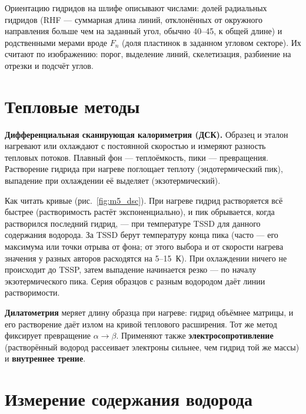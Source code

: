 Ориентацию гидридов на шлифе описывают числами: долей радиальных гидридов (RHF --- суммарная длина линий,
отклонённых от окружного направления больше чем на заданный угол, обычно 40--45\textdegree, к общей длине) и родственными
мерами вроде $F_n$ (доля пластинок в заданном угловом секторе). Их считают по изображению: порог, выделение линий,
скелетизация, разбиение на отрезки и подсчёт углов.

\section{Тепловые методы}

\textbf{Дифференциальная сканирующая калориметрия (ДСК).} Образец и эталон нагревают или охлаждают с постоянной
скоростью и измеряют разность тепловых потоков. Плавный фон --- теплоёмкость, пики --- превращения. Растворение
гидрида при нагреве поглощает теплоту (эндотермический пик), выпадение при охлаждении её выделяет
(экзотермический).


Как читать кривые (рис.~\ref{fig:m5_dsc}). При нагреве гидрид растворяется всё быстрее (растворимость растёт
экспоненциально), и пик обрывается, когда растворился последний гидрид, --- при температуре TSSD для данного
содержания водорода. За TSSD берут температуру конца пика (часто --- его максимума или точки отрыва от фона; от этого
выбора и от скорости нагрева значения у разных авторов расходятся на 5--15~К). При охлаждении ничего не происходит
до TSSP, затем выпадение начинается резко --- по началу экзотермического пика. Серия образцов с разным водородом
даёт линии растворимости.

\textbf{Дилатометрия} меряет длину образца при нагреве: гидрид объёмнее матрицы, и его растворение даёт излом на
кривой теплового расширения. Тот же метод фиксирует превращение $\alpha\to\beta$. Применяют также
\textbf{электросопротивление} (растворённый водород рассеивает электроны сильнее, чем гидрид той же массы) и
\textbf{внутреннее трение}.

\section{Измерение содержания водорода}

